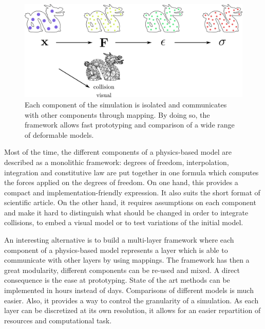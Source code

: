 \begin{figure}[!ht]
\centering
\includegraphics[scale=0.6]{./images/continuum_mechanics/multiLayeredFramework.png}
\caption[STAR mechanics: Multi-layer framework]{\label{fig:multiLayerFramework} Each component of the simulation is isolated and communicates with other components through mapping. By doing so, the framework allows fast prototyping and comparison of a wide range of deformable models.}
\end{figure}

Most of the time, the different components of a physics-based model are described as a monolithic framework: degrees of freedom, interpolation, integration and constitutive law are put together in one formula which computes the forces applied on the degrees of freedom. On one hand, this provides a compact and implementation-friendly expression. It also suits the short format of scientific article. On the other hand, it requires assumptions on each component and make it hard to distinguish what should be changed in order to integrate collisions, to embed a visual model or to test variations of the initial model.

An interesting alternative is to build a multi-layer framework where each component of a physics-based model represents a layer which is able to communicate with other layers by using mappings. The framework has then a great modularity, different components can be re-used and mixed. A direct consequence is the ease at prototyping. State of the art methods can be implemented in hours instead of days. Comparisons of different models is much easier. Also, it provides a way to control the granularity of a simulation. As each layer can be discretized at its own resolution, it allows for an easier repartition of resources and computational task.

